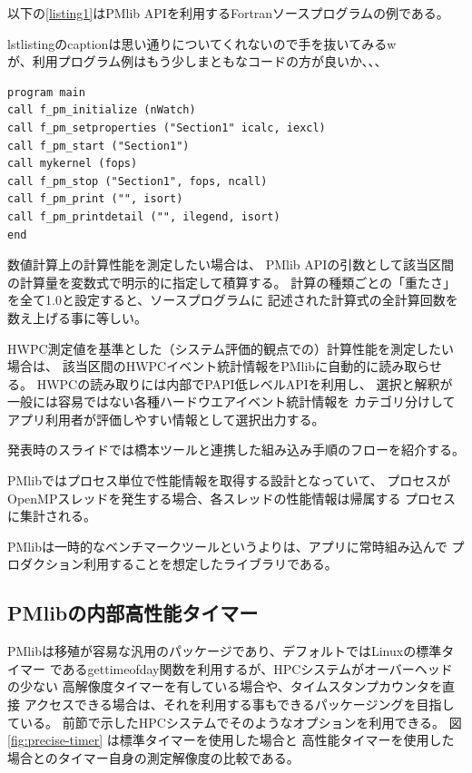 \documentclass[submit,techrep,noauthor]{ipsj}
\begin{document}
以下の\lstlistingname \ref{listing1}はPMlib APIを利用するFortranソースプログラムの例である。

{ \color{blue} \par
lstlistingのcaptionは思い通りについてくれないので手を抜いてみるw \\
が、利用プログラム例はもう少しまともなコードの方が良いか、、、
} \par
\begin{lstlisting}[caption={\hfill},label={listing1},captionpos=t]
program main
call f_pm_initialize (nWatch)
call f_pm_setproperties ("Section1" icalc, iexcl)
call f_pm_start ("Section1")
call mykernel (fops)
call f_pm_stop ("Section1", fops, ncall)
call f_pm_print ("", isort)
call f_pm_printdetail ("", ilegend, isort)
end
\end{lstlisting}

数値計算上の計算性能を測定したい場合は、
PMlib APIの引数として該当区間の計算量を変数式で明示的に指定して積算する。
計算の種類ごとの「重たさ」を全て1.0と設定すると、ソースプログラムに
記述された計算式の全計算回数を数え上げる事に等しい。

HWPC測定値を基準とした（システム評価的観点での）計算性能を測定したい場合は、
該当区間のHWPCイベント統計情報をPMlibに自動的に読み取らせる。
HWPCの読み取りには内部でPAPI低レベルAPIを利用し、
選択と解釈が一般には容易ではない各種ハードウエアイベント統計情報を
カテゴリ分けしてアプリ利用者が評価しやすい情報として選択出力する。

{ \color{blue} \par
発表時のスライドでは橋本ツールと連携した組み込み手順のフローを紹介する。
\par }

PMlibではプロセス単位で性能情報を取得する設計となっていて、
プロセスがOpenMPスレッドを発生する場合、各スレッドの性能情報は帰属する
プロセスに集計される。

PMlibは一時的なベンチマークツールというよりは、アプリに常時組み込んで
プロダクション利用することを想定したライブラリである。

\subsection{PMlibの内部高性能タイマー}
PMlibは移殖が容易な汎用のパッケージであり、デフォルトではLinuxの標準タイマー
であるgettimeofday関数を利用するが、HPCシステムがオーバーヘッドの少ない
高解像度タイマーを有している場合や、タイムスタンプカウンタを直接
アクセスできる場合は、それを利用する事もできるパッケージングを目指している。
前節で示したHPCシステムでそのようなオプションを利用できる。
図\ref{fig:precise-timer} は標準タイマーを使用した場合と
高性能タイマーを使用した場合とのタイマー自身の測定解像度の比較である。
\end{document}
